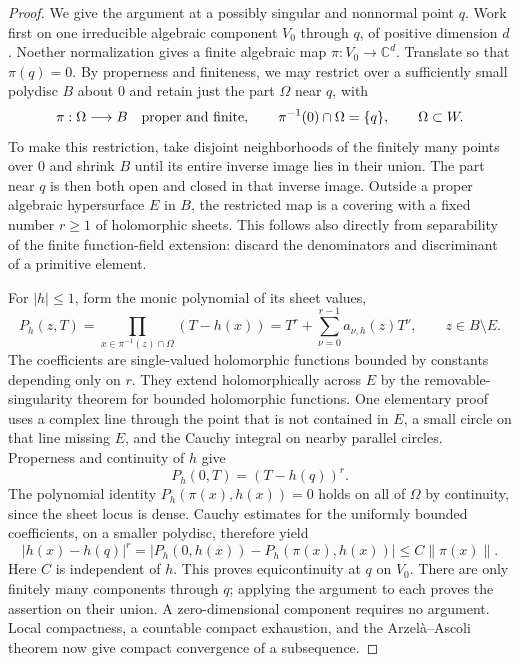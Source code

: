 \begin{proof}
We give the argument at a possibly singular and nonnormal point $q$.  Work first on one irreducible algebraic component $V_0$ through $q$, of positive dimension $d$.  Noether normalization \cite[Tag~\href{https://stacks.math.columbia.edu/tag/00OY}{00OY}]{Stacks} gives a finite algebraic map $\pi:V_0\to\mathbb{C}^d$.  Translate so that $\pi(q)=0$.  By properness and finiteness, we may restrict over a sufficiently small polydisc $B$ about $0$ and retain just the part $\Omega$ near $q$, with
\[
  \pi:\Omega\longrightarrow B\quad\hbox{proper and finite},
  \qquad \pi^{-1}(0)\cap\Omega=\{q\},\qquad \Omega\subset W.
\]
To make this restriction, take disjoint neighborhoods of the finitely many points over $0$ and shrink $B$ until its entire inverse image lies in their union.  The part near $q$ is then both open and closed in that inverse image. Outside a proper algebraic hypersurface $E$ in $B$, the restricted map is a covering with a fixed number $r\geq1$ of holomorphic sheets.  This follows also directly from separability of the finite function-field extension: discard the denominators and discriminant of a primitive element.

For $|h|\leq1$, form the monic polynomial of its sheet values,
\[
  P_h(z,T)=\prod_{x\in\pi^{-1}(z)\cap\Omega}(T-h(x))
           =T^r+\sum_{\nu=0}^{r-1}a_{\nu,h}(z)T^\nu,
  \qquad z\in B\setminus E.
\]
The coefficients are single-valued holomorphic functions bounded by constants depending only on $r$.  They extend holomorphically across $E$ by the removable-singularity theorem for bounded holomorphic functions. One elementary proof uses a complex line through the point that is not contained in $E$, a small circle on that line missing $E$, and the Cauchy integral on nearby parallel circles.  Properness and continuity of $h$ give
\[
                         P_h(0,T)=(T-h(q))^r.
\]
The polynomial identity $P_h(\pi(x),h(x))=0$ holds on all of $\Omega$ by continuity, since the sheet locus is dense.  Cauchy estimates for the uniformly bounded coefficients, on a smaller polydisc, therefore yield
\[
  |h(x)-h(q)|^r
   =|P_h(0,h(x))-P_h(\pi(x),h(x))|
   \leq C\|\pi(x)\|.
\]
Here $C$ is independent of $h$.  This proves equicontinuity at $q$ on $V_0$. There are only finitely many components through $q$; applying the argument to each proves the assertion on their union.  A zero-dimensional component requires no argument.  Local compactness, a countable compact exhaustion, and the Arzel\`a--Ascoli theorem now give compact convergence of a subsequence.


\end{proof}
